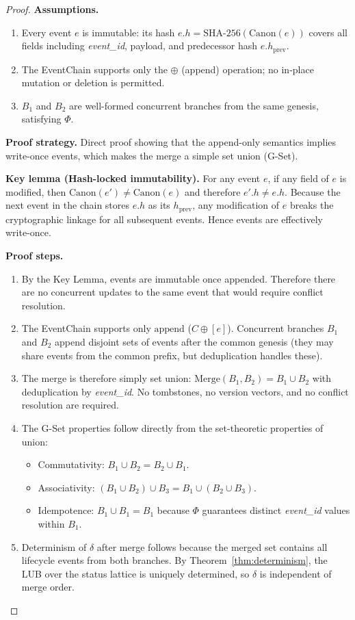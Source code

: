 \begin{proof}
\textbf{Assumptions.}
\begin{enumerate}[label=(A\arabic*),leftmargin=2em]
    \item Every event $e$ is immutable: its hash $e.h = \text{SHA-256}(\text{Canon}(e))$ covers all fields including \textit{event\_id}, payload, and predecessor hash $e.h_{\text{prev}}$.
    \item The EventChain supports only the $\oplus$ (append) operation; no in-place mutation or deletion is permitted.
    \item $B_1$ and $B_2$ are well-formed concurrent branches from the same genesis, satisfying $\Phi$.
\end{enumerate}

\textbf{Proof strategy.} Direct proof showing that the append-only semantics implies write-once events, which makes the merge a simple set union (G-Set).

\textbf{Key lemma (Hash-locked immutability).} For any event $e$, if any field of $e$ is modified, then $\text{Canon}(e') \neq \text{Canon}(e)$ and therefore $e'.h \neq e.h$. Because the next event in the chain stores $e.h$ as its $h_{\text{prev}}$, any modification of $e$ breaks the cryptographic linkage for all subsequent events. Hence events are effectively write-once.

\textbf{Proof steps.}
\begin{enumerate}[label=Step~\arabic*:,leftmargin=2em]
    \item By the Key Lemma, events are immutable once appended. Therefore there are no concurrent updates to the same event that would require conflict resolution.
    \item The EventChain supports only $\text{append}$ ($C \oplus [e]$). Concurrent branches $B_1$ and $B_2$ append disjoint sets of events after the common genesis (they may share events from the common prefix, but deduplication handles these).
    \item The merge is therefore simply set union: $\text{Merge}(B_1, B_2) = B_1 \cup B_2$ with deduplication by \textit{event\_id}. No tombstones, no version vectors, and no conflict resolution are required.
    \item The G-Set properties follow directly from the set-theoretic properties of union:
    \begin{itemize}
        \item Commutativity: $B_1 \cup B_2 = B_2 \cup B_1$.
        \item Associativity: $(B_1 \cup B_2) \cup B_3 = B_1 \cup (B_2 \cup B_3)$.
        \item Idempotence: $B_1 \cup B_1 = B_1$ because $\Phi$ guarantees distinct \textit{event\_id} values within $B_1$.
    \end{itemize}
    \item Determinism of $\delta$ after merge follows because the merged set contains all lifecycle events from both branches. By Theorem~\ref{thm:determinism}, the LUB over the status lattice is uniquely determined, so $\delta$ is independent of merge order.
\end{enumerate}


\end{proof}
